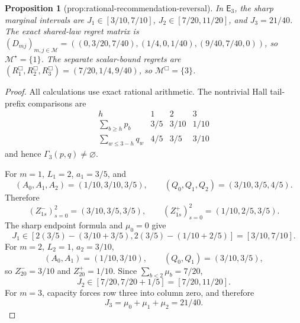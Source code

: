 \documentclass{article}
\newtheorem{proposition}{Proposition}
\begin{document}
\begin{proposition}[prop:rational-recommendation-reversal]\label{prop:rational-recommendation-reversal}
In \(\mathsf E_3\), the sharp marginal intervals are \(J_1\in[3/10,7/10]\), \(J_2\in[7/20,11/20]\), and \(J_3=21/40\). The exact shared-law regret matrix is \((D_{mj})_{m,j\in\mathcal M}=((0,3/20,7/40),(1/4,0,1/40),(9/40,7/40,0))\), so \(\mathcal M^\star=\{1\}\). The separate scalar-bound regrets are \((R_1^{\Box},R_2^{\Box},R_3^{\Box})=(7/20,1/4,9/40)\), so \(\mathcal M^{\Box}=\{3\}\).
\end{proposition}
\begin{proof}
All calculations use exact rational arithmetic.  The nontrivial Hall tail-prefix comparisons are
\[
 \begin{array}{c|ccc}
 h&1&2&3\\ \hline
 \sum_{b\ge h}p_b&3/5&3/10&1/10\\
 \sum_{w\le3-h}q_w&4/5&3/5&3/10
 \end{array}                                                \tag{1}
\]
and hence \(\Gamma_3(p,q)\ne\varnothing\).

For \(m=1\), \(L_1=2\), \(a_1=3/5\), and
\[
 (A_0,A_1,A_2)=(1/10,3/10,3/5),\qquad
 (Q_0,Q_1,Q_2)=(3/10,3/5,4/5).
\]
Therefore
\[
 (Z_{1s}^{-})_{s=0}^2=(3/10,3/5,3/5),\qquad
 (Z_{1s}^{+})_{s=0}^2=(1/10,2/5,3/5).                     \tag{2}
\]
The sharp endpoint formula and \(\mu_0=0\) give
\[
 J_1\in\left[2(3/5)-(3/10+3/5),
               2(3/5)-(1/10+2/5)\right]=[3/10,7/10].     \tag{3}
\]
For \(m=2\), \(L_2=1\), \(a_2=3/10\),
\[
 (A_0,A_1)=(1/10,3/10),\qquad (Q_0,Q_1)=(3/10,3/5),
\]
so \(Z_{20}^{-}=3/10\) and \(Z_{20}^{+}=1/10\).  Since \(\sum_{b<2}\mu_b=7/20\),
\[
 J_2\in[7/20,7/20+1/5]=[7/20,11/20].                     \tag{4}
\]
For \(m=3\), capacity forces row three into column zero, and therefore
\[
 J_3=\mu_0+\mu_1+\mu_2=21/40.                            \tag{5}
\]


\end{proof}
\end{document}
